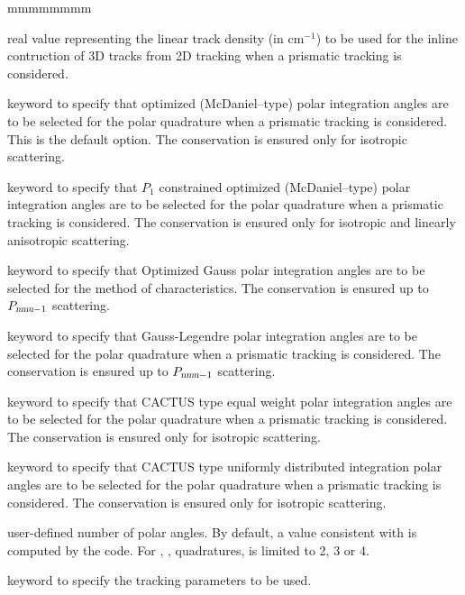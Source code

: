\begin{ListeDeDescription}{mmmmmmmm}
\item[\dusa{denspr}] real value representing the linear track density (in cm$^{-1}$) to be used for the inline contruction of 3D tracks from 2D tracking when a prismatic tracking is considered.

\item[\moc{LCMD}] keyword to specify that optimized (McDaniel--type) polar integration angles are to be
selected for the polar quadrature when a prismatic tracking is considered.\cite{LCMD} This is the default option. The conservation is ensured only for isotropic scattering.

\item[\moc{OPP1}] keyword to specify that $P_1$ constrained optimized (McDaniel--type) polar integration angles are to be selected for the polar quadrature when a prismatic tracking is considered.\cite{LeTellierpa} The conservation is ensured only for isotropic and linearly anisotropic scattering.

\item[\moc{OGAU}] keyword to specify that Optimized Gauss polar integration angles are to be
selected for the method of characteristics.\cite{LCMD,LeTellierpa} The conservation is ensured up to $P_{\dusa{nmu}-1}$ scattering.

\item[\moc{GAUS}] keyword to specify that Gauss-Legendre polar integration angles are to be selected for the polar quadrature when a prismatic tracking is considered. The conservation is ensured up to $P_{\dusa{nmu}-1}$ scattering.

\item[\moc{CACA}] keyword to specify that CACTUS type equal weight polar integration angles are to be
selected for the polar quadrature when a prismatic tracking is considered.\cite{CACTUS} The conservation is ensured only for isotropic scattering.

\item[\moc{CACB}] keyword to specify that CACTUS type uniformly distributed integration polar angles
are to be selected for the polar quadrature when a prismatic tracking is considered.\cite{CACTUS} The conservation is ensured only for isotropic scattering.

\item[\dusa{nmu}] user-defined number of polar angles. By default, a value consistent with  is computed by the code. For , ,  quadratures,  is limited to 2, 3 or 4.

\item[\moc{TRAK}] keyword to specify the tracking parameters to be used. 


\end{ListeDeDescription}
